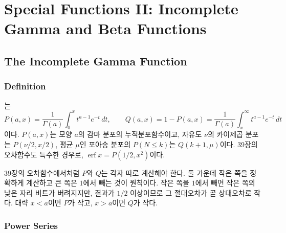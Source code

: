 \chapter{Special Functions II: Incomplete Gamma and Beta Functions}
\label{ch:special-2}


\section{The Incomplete Gamma Function}
\label{sec:incomplete-gamma}

\subsection{Definition}

는
\[
P(a,x)=\frac1{\Gamma(a)}\int_0^xt^{a-1}e^{-t}\,dt,\qquad Q(a,x)=1-P(a,x)=\frac1{\Gamma(a)}\int_x^\infty t^{a-1}e^{-t}\,dt
\]
이다. $P(a,x)$는 모양 $a$의 감마 분포의 누적분포함수이고, 자유도 $\nu$의 카이제곱 분포는 $P(\nu/2,x/2)$, 평균 $\mu$인 포아송 분포의 $P(N\le k)$는 $Q(k+1,\mu)$이다. 39장의 오차함수도 특수한 경우로, $\operatorname{erf}x=P(1/2,x^2)$이다.

39장의 오차함수에서처럼 $P$와 $Q$는 각자 따로 계산해야 한다. 둘 가운데 작은 쪽을 정확하게 계산하고 큰 쪽은 $1$에서 빼는 것이 원칙이다. 작은 쪽을 $1$에서 빼면 작은 쪽의 낮은 자리 비트가 버려지지만, 결과가 $1/2$ 이상이므로 그 절대오차가 곧 상대오차로 작다. 대략 $x<a$이면 $P$가 작고, $x>a$이면 $Q$가 작다.

\subsection{Power Series}

